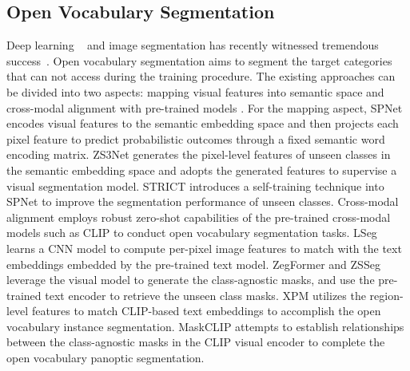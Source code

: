 \documentclass[10pt,twocolumn,letterpaper]{article}
\begin{document}
\subsection{Open Vocabulary Segmentation}
Deep learning ~\cite{li2020pams, ren2021online, xia2022trt, li2019oicsr, wu2020tree, xiao2017design, wu2020fine} and image segmentation has recently witnessed tremendous success~\cite{chen2017deeplab, chen2018encoder, yang2018denseaspp, sun2019deep, cheng2021per, qin2022multi, qin2022activation}.
Open vocabulary segmentation aims to segment the target categories that can not access during the training procedure.
The existing approaches can be divided into two aspects: mapping visual features into semantic space \cite{xian2019semantic, bucher2019zero, gu2020context} and cross-modal alignment with pre-trained models \cite{li2022language, ding2022decoupling, xu2021simple}. 
For the mapping aspect, SPNet\cite{xian2019semantic} encodes visual features to the semantic embedding space and then projects each pixel feature to predict probabilistic outcomes through a fixed semantic word encoding matrix.
ZS3Net\cite{bucher2019zero}  generates the pixel-level features of unseen classes in the semantic embedding space and adopts the generated features to supervise a visual segmentation model. 
STRICT\cite{pastore2021closer} introduces a self-training technique into SPNet to improve the segmentation performance of unseen classes. 
Cross-modal alignment employs robust zero-shot capabilities of the pre-trained cross-modal models such as CLIP\cite{radford2021learning}
to conduct open vocabulary segmentation tasks. 
LSeg\cite{li2022language} learns a CNN model to compute per-pixel image features to match with the text embeddings embedded by the pre-trained text model. 
ZegFormer\cite{ding2022decoupling} and ZSSeg\cite{xu2021simple} leverage the visual model to generate the class-agnostic masks, and use the pre-trained text encoder to retrieve the unseen class masks. 
XPM\cite{huynh2022open} utilizes the region-level features to match CLIP-based text embeddings to accomplish the open vocabulary instance segmentation. MaskCLIP\cite{ding2022open} attempts to establish relationships between the class-agnostic masks in the CLIP visual encoder to complete the open vocabulary panoptic segmentation.
\end{document}
